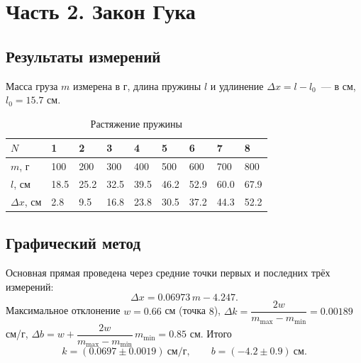\documentclass[12pt]{article}
\begin{document}
    \section{Часть 2. Закон Гука}

    \subsection{Результаты измерений}

    Масса груза $m$ измерена в г, длина пружины $l$ и удлинение $\varDelta x = l - l_0$~--- в см, $l_0 = 15.7$ см.

    \begin{table}[H]
        \centering
        \begin{xltabular}{\textwidth}{@{}XXXXXXXXX@{}}
            \toprule
            $N$ & 1 & 2 & 3 & 4 & 5 & 6 & 7 & 8\\
            \midrule
            $m$, г & 100 & 200 & 300 & 400 & 500 & 600 & 700 & 800\\
            $l$, см & 18.5 & 25.2 & 32.5 & 39.5 & 46.2 & 52.9 & 60.0 & 67.9\\
            $\varDelta x$, см & 2.8 & 9.5 & 16.8 & 23.8 & 30.5 & 37.2 & 44.3 & 52.2\\
            \bottomrule
        \end{xltabular}
        \caption{Растяжение пружины}
    \end{table}

    \subsection{Графический метод}

    Основная прямая проведена через средние точки первых и последних трёх измерений:
    \[
    	\varDelta x = 0.06973\, m - 4.247.
    \]
    Максимальное отклонение $w = 0.66$ см (точка $8$), $\varDelta k = \dfrac{2w}{m_{\max} - m_{\min}} = 0.00189$ см/г, $\varDelta b = w + \dfrac{2w}{m_{\max} - m_{\min}}\,m_{\min} = 0.85$ см. Итого
    \[
    	k = (0.0697 \pm 0.0019) \ \text{см/г}, \qquad b = (-4.2 \pm 0.9) \ \text{см}.
    \]
\end{document}
